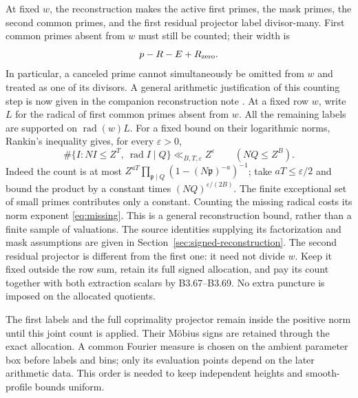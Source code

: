 \documentclass[11pt]{article}
\theoremstyle{definition}
\newcommand{\eps}{\varepsilon}
\begin{document}
At fixed $w$, the reconstruction makes the active first primes,
the mask primes, the second common primes, and the first residual
projector label divisor-many. First common primes absent from $w$ must
still be counted; their width is
\begin{equation}\label{eq:missing}
 p-R-E+R_{\rm zero}.
\end{equation}
In particular, a canceled prime cannot simultaneously be omitted from
$w$ and treated as one of its divisors. A general arithmetic justification
of this counting step is now given in the companion reconstruction note
\cite{gaov2}. At a fixed row $w$, write $L$ for the radical of first
common primes absent from $w$. All the remaining labels are supported
on $\operatorname{rad}(w)L$. For a fixed bound on their logarithmic norms,
Rankin's inequality gives, for every $\eps>0$,
\[
 \#\{I:NI\le Z^T,\ \operatorname{rad}I\mid Q\}
 \ll_{B,T,\eps}Z^\eps\qquad(NQ\le Z^B).
\]
Indeed the count is at most
$Z^{aT}\prod_{\mathfrak p\mid Q}(1-(N\mathfrak p)^{-a})^{-1}$;
take $aT\le\eps/2$ and bound the product by a constant times
$(NQ)^{\eps/(2B)}$. The finite exceptional set of small primes contributes
only a constant. Counting the missing radical costs its norm exponent
\eqref{eq:missing}. This is a general reconstruction bound, rather than a finite sample of
valuations. The source identities supplying its factorization and mask
assumptions are given in Section~\ref{sec:signed-reconstruction}.
The second residual projector is different from the first one: it need
not divide $w$. Keep it fixed outside the row sum, retain its full signed
allocation, and pay its count together with both extraction scalars by
B3.67--B3.69. No extra puncture is imposed on the allocated quotients.

The first labels and the full coprimality projector remain inside the
positive norm until this joint count is applied. Their M\"obius signs
are retained through the exact allocation. A common Fourier measure is
chosen on the ambient parameter box before labels and bins; only its
evaluation points depend on the later arithmetic data. This order is
needed to keep independent heights and smooth-profile bounds uniform.
\end{document}
